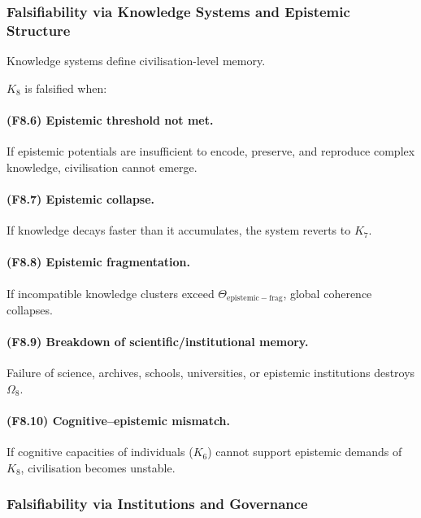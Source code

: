 \subsubsection{Falsifiability via Knowledge Systems and Epistemic Structure}

Knowledge systems define civilisation-level memory.

$K_8$ is falsified when:

\paragraph{(F8.6) Epistemic threshold not met.}
If epistemic potentials are insufficient
to encode, preserve, and reproduce complex knowledge,
civilisation cannot emerge.

\paragraph{(F8.7) Epistemic collapse.}
If knowledge decays faster than it accumulates,
the system reverts to $K_7$.

\paragraph{(F8.8) Epistemic fragmentation.}
If incompatible knowledge clusters exceed
$\Theta_{\mathrm{epistemic-frag}}$,
global coherence collapses.

\paragraph{(F8.9) Breakdown of scientific/institutional memory.}
Failure of science, archives, schools, universities,
or epistemic institutions destroys $\Omega_8$.

\paragraph{(F8.10) Cognitive–epistemic mismatch.}
If cognitive capacities of individuals ($K_6$)
cannot support epistemic demands of $K_8$,
civilisation becomes unstable.



\subsubsection{Falsifiability via Institutions and Governance}

